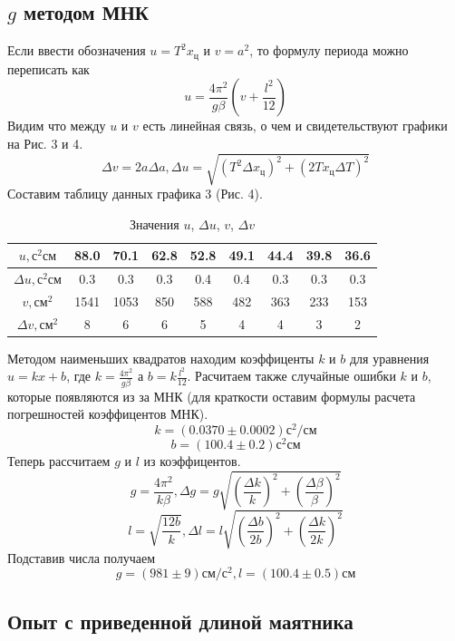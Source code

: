 \documentclass[a4paper, 12pt]{article}
\begin{document}
    \subsection{$g$ методом МНК}
    Если ввести обозначения $u=T^2x_ц$ и $v=a^2$, то формулу периода можно переписать как
    \[u=\frac{4\pi^2}{g\beta}(v+\frac{l^2}{12})\]
    Видим что между $u$ и $v$ есть линейная связь, о чем и свидетельствуют графики на Рис. 3 и 4.
    \[\Delta v = 2a\Delta a, \Delta u = \sqrt{(T^2\Delta x_ц)^2 + (2Tx_ц\Delta T)^2}\]
    Составим таблицу данных графика 3 (Рис. 4).
    \begin{table}[h!]
        \begin{center}

         \begin{tabular}{|c|c|c|c|c|c|c|c|c|}
            \hline
            \textbf{$u, с^{2}см$} & 88.0 & 70.1 & 62.8 & 52.8 & 49.1 & 44.4 & 39.8 & 36.6\\
            \hline
            \textbf{$\Delta u,с^{2}см$} & 0.3 & 0.3 & 0.3 & 0.4 & 0.4 & 0.3 & 0.3 & 0.3\\
            \hline
            \textbf{$v, см^{2}$} & 1541 & 1053 &  850 &  588 &  482 &  363 &  233 &  153\\
            \hline
            \textbf{$\Delta v, см^{2}$} & 8 & 6 & 6 & 5 & 4 & 4 & 3 & 2\\
            \hline
         \end{tabular}
         \caption{Значения $u$, $\Delta u$, $v$, $\Delta v$}
        \end{center}

    \end{table}
    \newline
    Методом наименьших квадратов находим коэффиценты $k$ и $b$ для уравнения $u=kx+b$, где $k=\frac{4\pi^2}{g\beta}$ а $b=k\frac{l^2}{12}$. Расчитаем также случайные ошибки $k$ и $b$, которые появляются из за МНК (для краткости оставим формулы расчета погрешностей коэффицентов МНК).
    \[k=(0.0370\pm0.0002)с^2/см\]
    \[b=(100.4\pm0.2)с^2см\]
    Теперь рассчитаем $g$ и $l$ из коэффицентов.
    \[g=\frac{4\pi^2}{k\beta}, \Delta g = g\sqrt{\left(\frac{\Delta k}{k}\right)^2 + \left(\frac{\Delta \beta}{\beta}\right)^2}\]
    \[l=\sqrt{\frac{12b}{k}}, \Delta l = l\sqrt{\left(\frac{\Delta b}{2b}\right)^2+\left(\frac{\Delta k}{2k}\right)^2}\]
    Подставив числа получаем
    \[g=(981\pm9)см/с^2, l=(100.4\pm0.5)см\]

    \subsection{Опыт с приведенной длиной маятника}
\end{document}
